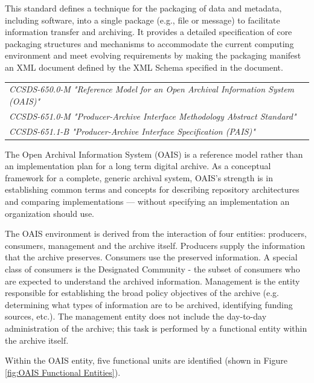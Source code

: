 This standard defines a technique for the packaging of data and metadata, including software, into a single package (e.g., file or message) to facilitate information transfer and archiving. It provides a detailed specification of core packaging structures and mechanisms to accommodate the current computing environment and meet evolving requirements by making the packaging manifest an XML document defined by the XML Schema specified in the document.

\begin{tabular}{l}
\textit{CCSDS-650.0-M "Reference Model for an Open Archival Information System (OAIS)" \cite{CCSDS-650.0-M}} \\
\textit{CCSDS-651.0-M "Producer-Archive Interface Methodology Abstract Standard" \cite{CCSDS-651.0-M}} \\
\textit{CCSDS-651.1-B "Producer-Archive Interface Specification (PAIS)" \cite{CCSDS-651.1-B}} \\
\end{tabular}

The Open Archival Information System (OAIS) is a reference model rather than an implementation plan for a long term digital archive. As a conceptual framework for a complete, generic archival system, OAIS's strength is in establishing common terms and concepts for describing repository architectures and comparing implementations — without specifying an implementation an organization should use. 

The OAIS environment is derived from the interaction of four entities: producers, consumers, management and the archive itself. Producers supply the information that the archive preserves. Consumers use the preserved information. A special class of consumers is the Designated Community - the subset of consumers who are expected to understand the archived information. Management is the entity responsible for establishing the broad policy objectives of the archive (e.g. determining what types of information are to be archived, identifying funding sources, etc.). The management entity does not include the day-to-day administration of the archive; this task is performed by a functional entity within the archive itself.

Within the OAIS entity, five functional units are identified (shown in Figure \ref{fig:OAIS Functional Entities}).

